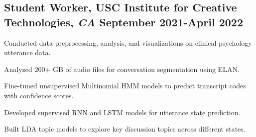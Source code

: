\documentclass[10pt]{article}
\begin{document}
\subsection*{Student Worker{\normalfont, USC Institute for Creative
            Technologies,
            \textit{CA} \hfill
            September 2021-April 2022}}
\begin{asparaitem}
    \item Conducted data preprocessing, analysis, and visualizations on clinical psychology utterance data.
    \item Analyzed 200+ GB of audio files for conversation segmentation using ELAN.
    \item Fine-tuned unsupervised Multinomial HMM models to predict transcript codes with confidence scores.
    \item Developed supervised RNN and LSTM models for utterance state prediction.
    \item Built LDA topic models to explore key discussion topics across different states.
\end{asparaitem}

\end{document}
